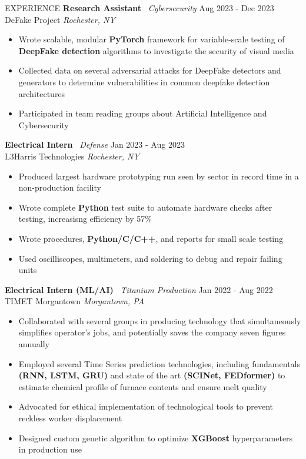 \documentclass{resume} %
\begin{document}
\begin{rSection}{EXPERIENCE}
\textbf{Research Assistant} \textbar\ \textit{Cybersecurity} \hfill Aug 2023 - Dec 2023\\
DeFake Project \hfill \textit{Rochester, NY}
\begin{itemize}
\itemsep-3pt {}
    \item Wrote scalable, modular \textbf{PyTorch} framework for variable-scale testing of \textbf{DeepFake detection} algorithms to investigate the security of visual media
    \item Collected data on several adversarial attacks for DeepFake detectors and generators to determine vulnerabilities in common deepfake detection architectures
    \item Participated in team reading groups about Artificial Intelligence and Cybersecurity
\end{itemize}

\textbf{Electrical Intern} \textbar\ \textit{Defense} \hfill Jan 2023 - Aug 2023\\
L3Harris Technologies \hfill \textit{Rochester, NY}
\begin{itemize}
\itemsep-3pt {}
    \item Produced largest hardware prototyping run seen by sector in record time in a non-production facility
    \item Wrote complete \textbf{Python} test suite to automate hardware checks after testing, increasisng efficiency by 57\%
    \item Wrote procedures, \textbf{Python/C/C++}, and reports for small scale testing
    \item Used oscilliscopes, multimeters, and soldering to debug and repair failing units
\end{itemize}

    \textbf{Electrical Intern (ML/AI)} \textbar\ \textit{Titanium Production} \hfill Jan 2022 - Aug 2022\\
TIMET Morgantown \hfill \textit{Morgantown, PA}
\begin{itemize}
    \itemsep-3pt {}
    \item Collaborated with several groups in producing technology that simultaneously simplifies operator’s jobs, and potentially saves the company seven figures annually
    \item Employed several Time Series prediction technologies, including fundamentals \textbf{(RNN, LSTM, GRU)} and state of the art \textbf{(SCINet, FEDformer)} to estimate chemical profile of furnace contents and ensure melt quality
    \item Advocated for ethical implementation of technological tools to prevent reckless worker displacement
    \item Designed custom genetic algorithm to optimize \textbf{XGBoost} hyperparameters in production use
\end{itemize}

\end{rSection} 
\end{document}

